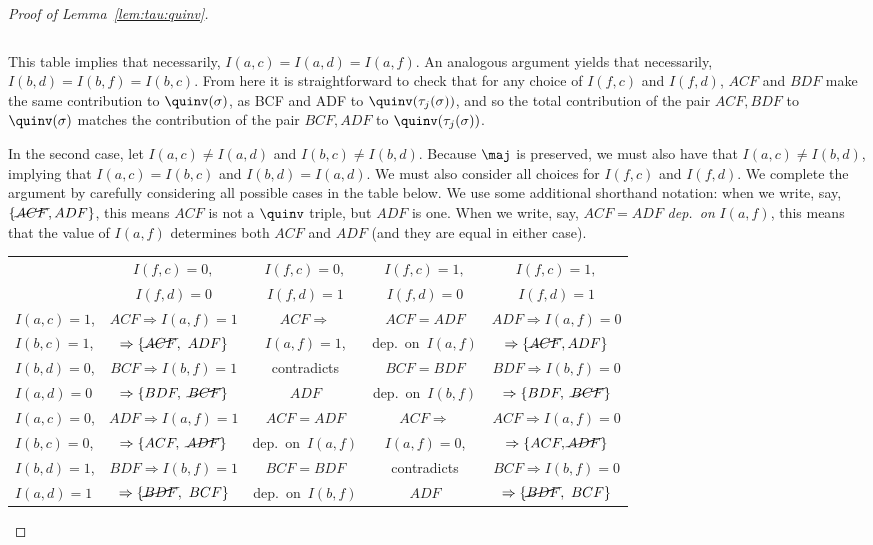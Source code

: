 \begin{proof}[Proof of Lemma~\ref{lem:tau:quinv}]
\begin{center}
{\begin{tabular}{l|c|c|}
\end{tabular}
}
\end{center}
 
This table implies that necessarily, $I(a,c)=I(a,d)=I(a,f)$.
An analogous argument yields that necessarily, $I(b,d)=I(b,f)=I(b,c)$. From here it is straightforward to check that for any choice of $I(f,c)$ and $I(f,d)$, $ACF$ and $BDF$ make the same contribution to $\quinv(\sigma)$, as BCF and ADF to $\quinv(\tau_j(\sigma))$, and so the total contribution of the pair $ACF, BDF$ to $\quinv(\sigma)$ matches the contribution of the pair $BCF, ADF$ to $\quinv(\tau_j(\sigma))$.  

In the second case, let $I(a,c)\neq I(a,d)$ and $I(b,c)\neq I(b,d)$. Because $\maj$ is preserved, we must also have that $I(a,c)\neq I(b,d)$, implying that $I(a,c)=I(b,c)$ and $I(b,d)=I(a,d)$. We must also consider all choices for $I(f,c)$ and $I(f,d)$. We complete the argument by carefully considering all possible cases in the table below. We use some additional shorthand notation: when we write, say, $\{\cancel{ACF}, ADF\}$, this means $ACF$ is not a $\quinv$ triple, but $ADF$ is one. When we write, say, $ACF=ADF$ \emph{dep.~on} $I(a,f)$, this means that the value of $I(a,f)$ determines both $ACF$ and $ADF$ (and they are equal in either case).

{\renewcommand{\arraystretch}{1.2}
\flushleft
\footnotesize
\begin{tabular}{l|c|c|c|c|}
& $I(f,c)=0,$ & $I(f,c)=0,$ & $I(f,c)=1,$ & $I(f,c)=1,$\\ 
& $I(f,d)=0$ & $I(f,d)=1$ & $I(f,d)=0$ & $I(f,d)=1$\\ \hline
$I(a,c)=1$, & $ACF \Rightarrow I(a,f)=1$ & $ACF \Rightarrow$ & $ACF=ADF$ & $ADF \Rightarrow I(a,f)=0$  \\
$I(b,c)=1$,& $\Rightarrow\{\cancel{ACF},\ ADF\}$ & $I(a,f)=1$, &dep.~on~$I(a,f)$ & $\Rightarrow\{\cancel{ACF}, ADF\}$  \\
$I(b,d)=0$, & $BCF \Rightarrow I(b,f)=1$ & contradicts & $BCF=BDF$  & $BDF \Rightarrow I(b,f)=0$  \\ 
$I(a,d)=0$& $\Rightarrow \{BDF,\ \cancel{BCF}\}$ & $ADF$ &dep.~on~$I(b,f)$ & $\Rightarrow \{BDF,\ \cancel{BCF}\}$  \\\hline
$I(a,c)=0$, & $ADF \Rightarrow I(a,f)=1$ & $ACF=ADF$ & $ACF \Rightarrow$ & $ACF \Rightarrow I(a,f)=0$  \\
$I(b,c)=0$,& $\Rightarrow \{ACF,\ \cancel{ADF}\}$ &dep.~on~$I(a,f)$ & $I(a,f)=0$, & $\Rightarrow \{ACF, \cancel{ADF}\}$  \\
$I(b,d)=1$, & $BDF \Rightarrow I(b,f)=1$ & $BCF=BDF$ & contradicts  & $BCF \Rightarrow I(b,f)=0$  \\ 
$I(a,d)=1$& $\Rightarrow\{\cancel{BDF},\ BCF\}$ &dep.~on~$I(b,f)$ & 
$ADF$ & $\Rightarrow\{\cancel{BDF},\ BCF\}$  \\\hline
\end{tabular}
}


\end{proof}
